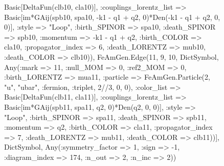 \documentclass{revtex4}
\begin{document}
\begin{figure}[!htb]
\begin{center}
{Basic[DeltaFun(clb10, cla10)], :couplings_lorentz_list => Basic[im*GAij(spb10, spa10, -k1 - q1 + q2, 0)*Den(-k1 - q1 + q2, 0, 0)], :style => "Loop", :birth_SPINOR => spa10, :death_SPINOR => spb10, :momentum => -k1 - q1 + q2, :birth_COLOR => cla10, :propagator_index => 6, :death_LORENTZ => mub10, :death_COLOR => clb10)), FeAmGen.Edge(11, 9, 10, Dict{Symbol, Any}(:mark => 11, :null_MOM => 0, :ref2_MOM => 0, :birth_LORENTZ => mua11, :particle => FeAmGen.Particle(2, "u", "ubar", :fermion, :triplet, 2//3, 0, 0), :color_list => Basic[DeltaFun(clb11, cla11)], :couplings_lorentz_list => Basic[im*GAij(spb11, spa11, q2, 0)*Den(q2, 0, 0)], :style => "Loop", :birth_SPINOR => spa11, :death_SPINOR => spb11, :momentum => q2, :birth_COLOR => cla11, :propagator_index => 7, :death_LORENTZ => mub11, :death_COLOR => clb11))], Dict{Symbol, Any}(:symmetry_factor => 1, :sign => -1, :diagram_index => 174, :n_out => 2, :n_inc => 2)) 
}
\end{center}
\end{figure}
\end{document}
